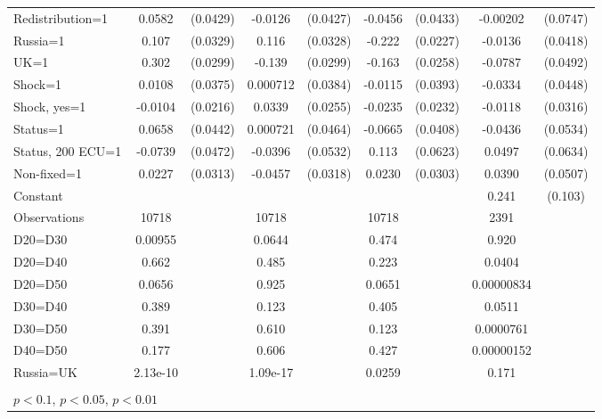 \begin{tabular}{l|cccccc|cc}
Redistribution=1&   0.0582         & (0.0429)&  -0.0126         & (0.0427)&  -0.0456         & (0.0433)& -0.00202         & (0.0747)\\
Russia=1        &    0.107\sym{***}& (0.0329)&    0.116\sym{***}& (0.0328)&   -0.222\sym{***}& (0.0227)&  -0.0136         & (0.0418)\\
UK=1            &    0.302\sym{***}& (0.0299)&   -0.139\sym{***}& (0.0299)&   -0.163\sym{***}& (0.0258)&  -0.0787         & (0.0492)\\
Shock=1         &   0.0108         & (0.0375)& 0.000712         & (0.0384)&  -0.0115         & (0.0393)&  -0.0334         & (0.0448)\\
Shock, yes=1    &  -0.0104         & (0.0216)&   0.0339         & (0.0255)&  -0.0235         & (0.0232)&  -0.0118         & (0.0316)\\
Status=1        &   0.0658         & (0.0442)& 0.000721         & (0.0464)&  -0.0665         & (0.0408)&  -0.0436         & (0.0534)\\
Status, 200 ECU=1&  -0.0739         & (0.0472)&  -0.0396         & (0.0532)&    0.113\sym{*}  & (0.0623)&   0.0497         & (0.0634)\\
Non-fixed=1     &   0.0227         & (0.0313)&  -0.0457         & (0.0318)&   0.0230         & (0.0303)&   0.0390         & (0.0507)\\
Constant        &                  &         &                  &         &                  &         &    0.241\sym{**} &  (0.103)\\
\hline
Observations    &    10718         &         &    10718         &         &    10718         &         &     2391         &         \\
D20=D30         &  0.00955         &         &   0.0644         &         &    0.474         &         &    0.920         &         \\
D20=D40         &    0.662         &         &    0.485         &         &    0.223         &         &   0.0404         &         \\
D20=D50         &   0.0656         &         &    0.925         &         &   0.0651         &         &0.00000834         &         \\
D30=D40         &    0.389         &         &    0.123         &         &    0.405         &         &   0.0511         &         \\
D30=D50         &    0.391         &         &    0.610         &         &    0.123         &         &0.0000761         &         \\
D40=D50         &    0.177         &         &    0.606         &         &    0.427         &         &0.00000152         &         \\
Russia=UK       & 2.13e-10         &         & 1.09e-17         &         &   0.0259         &         &    0.171         &         \\
\hline\hline
\multicolumn{9}{p{16cm}}{\tiny }\\
\multicolumn{9}{l}{\tiny \sym{*} \(p<0.1\), \sym{**} \(p<0.05\), \sym{***} \(p<0.01\)}\\
\end{tabular}